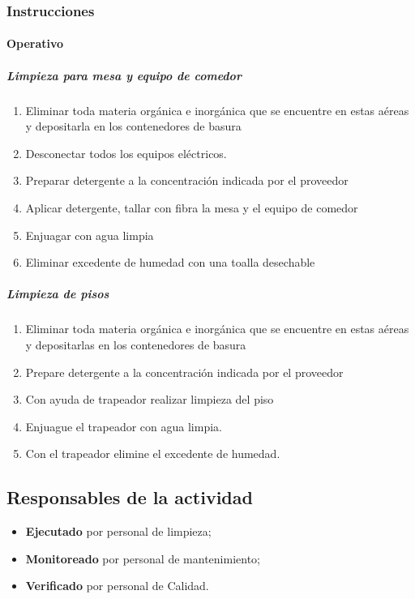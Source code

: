 \subsubsection{Instrucciones}

\paragraph{Operativo}

\subparagraph{Limpieza para mesa y equipo de comedor}

\begin{enumerate}
	\item Eliminar toda materia orgánica e inorgánica que se encuentre en estas aéreas y depositarla en los contenedores de basura
	\item Desconectar todos los equipos eléctricos.
	\item Preparar detergente a la concentración indicada por el proveedor
	\item Aplicar detergente, tallar con fibra la mesa y el equipo de comedor
	\item Enjuagar con agua limpia
	\item Eliminar excedente de humedad con una toalla desechable
\end{enumerate}

\subparagraph{Limpieza de pisos}

\begin{enumerate}
	\item Eliminar toda materia orgánica e inorgánica que se encuentre en estas aéreas y depositarlas en los contenedores de basura
	\item Prepare detergente a la concentración indicada por el proveedor
	\item Con ayuda de trapeador realizar limpieza del piso
	\item Enjuague el trapeador con agua limpia.
	\item Con el trapeador elimine el excedente de humedad.
\end{enumerate}

\subsection{Responsables de la actividad}

\begin{itemize}
	\item \textbf{Ejecutado} por personal de limpieza;
	\item \textbf{Monitoreado} por personal de mantenimiento;
	\item \textbf{Verificado} por personal de Calidad.
\end{itemize}


